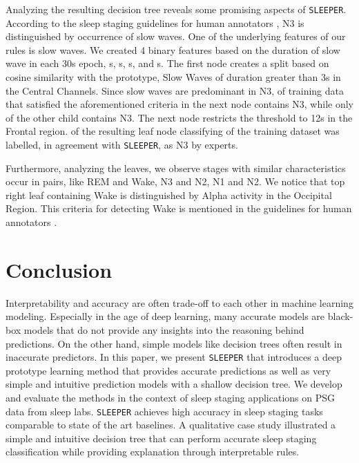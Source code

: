 \documentclass[pmlr]{jmlr}
\newcommand{\mname}
{\texttt{SLEEPER}\xspace}
\begin{document}
Analyzing the resulting decision tree reveals some promising aspects of \mname. According to the sleep staging guidelines for human annotators \citep{berry2012aasm}, N3 is distinguished by occurrence of slow waves. One of the underlying features of our rules is slow waves. We created 4 binary features based on the duration of slow wave in each 30s epoch, s, s, s, and s. The first node creates a split based on cosine similarity  with the prototype, Slow Waves of duration greater than 3s in the Central Channels. Since slow waves are predominant in N3,  of training data that satisfied the aforementioned criteria in the next node contains N3, while only  of the other child contains N3. The next node restricts the threshold to 12s in the Frontal region.  of the resulting leaf node classifying  of the training dataset was labelled, in agreement with \mname, as N3 by experts.

Furthermore, analyzing the leaves, we observe stages with similar characteristics occur in pairs, like REM and Wake, N3 and N2, N1 and N2. We notice that top right leaf containing Wake is distinguished by Alpha activity in the Occipital Region. This criteria for detecting Wake is mentioned in the guidelines for human annotators \citep{berry2012aasm}.






 






\section{Conclusion}
Interpretability and accuracy are often trade-off to each other in machine learning modeling. Especially in the age of deep learning, many accurate models are black-box models that do not provide any insights into the reasoning behind predictions. On the other hand, simple models like decision trees often result in inaccurate predictors. In this paper, we present \mname that introduces a deep prototype learning method that provides accurate predictions as well as very simple and intuitive prediction models with a shallow decision tree. We develop and evaluate the methods in the context of sleep staging applications on PSG data from sleep labs. \mname achieves high accuracy in sleep staging tasks comparable to state of the art baselines. A qualitative case study illustrated a simple and intuitive decision tree that can perform accurate sleep staging classification while providing explanation through interpretable rules. 
\end{document}
